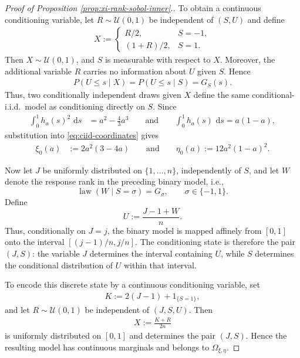 \documentclass{article}
\newcommand{\de}{\mathrm{\,d}}
\newcommand{\cU}{\mathcal{U}}
\begin{document}
\begin{proof}[Proof of Proposition \ref{prop:xi-rank-sobol-inner}.]
To obtain a continuous conditioning variable, let \(R\sim\cU(0,1)\) be independent of \((S,U)\) and define
\begin{align*}
    X
    :=
    \begin{cases}
        R/2, & S=-1,\\
        (1+R)/2, & S=1.
    \end{cases}
\end{align*}
Then \(X\sim\cU(0,1)\), and \(S\) is measurable with respect to \(X\).
Moreover, the additional variable \(R\) carries no information about \(U\) given \(S\).
Hence
\begin{align}\label{eq_mix_S}
    P(U\leq s\mid X)
    =
    P(U\leq s\mid S)
    =
    G_S(s).
\end{align}
Thus, two conditionally independent draws given \(X\) define the same conditional-i.i.d.\ model as conditioning directly on \(S\).
Since
\begin{align*}
    \int_0^1h_a(s)^2\,\de s
    &=
    a^2-\frac43a^3 \qquad \text{and} \qquad
    \int_0^1h_a(s)\,\de s
    =
    a(1-a),
\end{align*}
substitution into \eqref{eq:ciid-coordinates} gives
\begin{align*}
    \xi_0(a)
    &:=
    2a^2(3-4a)\qquad \text{and} \qquad
    \eta_0(a)
    :=
    12a^2(1-a)^2.
\end{align*}

Now let \(J\) be uniformly distributed on \(\{1,\ldots,n\}\), independently of \(S\), and let \(W\) denote the response rank in the preceding binary model, i.e.,
\[
    \operatorname{law}(W\mid S=\sigma)=G_\sigma,
    \qquad \sigma\in\{-1,1\}.
\]
Define
\[
    U:=\frac{J-1+W}{n}.
\]
Thus, conditionally on \(J=j\), the binary model is mapped affinely from \([0,1]\) onto the interval
\(
[(j-1)/n,j/n]
\).
The conditioning state is therefore the pair \((J,S)\): the variable \(J\)
determines the interval containing \(U\), while \(S\) determines the
conditional distribution of \(U\) within that interval.

To encode this discrete state by a continuous conditioning variable, set
\begin{align*}
    K:=2(J-1)+1_{\{S=1\}},
\end{align*}
and let \(R\sim\cU(0,1)\) be independent of \((J,S,U)\). Then
\begin{align*}
    X:=\frac{K+R}{2n}
\end{align*}
is uniformly distributed on \([0,1]\) and determines the pair \((J,S)\).
Hence the resulting model has continuous marginals and belongs to
\(\Omega_{\xi,\eta}\).


\end{proof}
\end{document}
